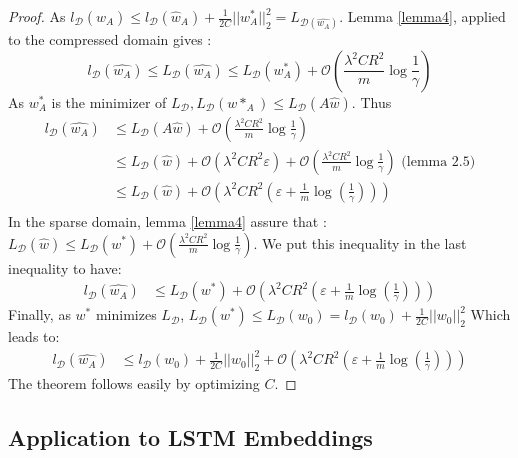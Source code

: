 \documentclass{article}
\begin{document}
\begin{proof} As 
$l_{\mathcal{D}}(\hat{w}_A) \leq l_{\mathcal{D}}(\hat{w}_A) 
+ \frac{1}{2C} ||w^*_A||_2^2 = L_{\mathcal{D}(\hat{w_A})}$.
Lemma \ref{lemma4}, applied to the compressed domain gives :
\[ l_\mathcal{D}(\hat{w_A}) \leq
    L_\mathcal{D}(\hat{w_A}) 
    \leq L_\mathcal{D}(w_A^*) 
    + \mathcal{O}\left (\frac{\lambda^2 C R^2}{m}\log \frac{1}{\gamma} \right )
\]
As $w^*_A$ is the minimizer of
 $L_{\mathcal{D}}, L_{\mathcal{D}}(w*_A) \leq L_{\mathcal{D}}(A\hat{w}) $.
Thus 
\begin{align*}
    l_\mathcal{D}(\hat{w_A}) 
    &\leq L_\mathcal{D}(A\hat{w}) 
    + \mathcal{O}\left (\frac{\lambda^2 C R^2}{m}\log \frac{1}{\gamma} \right ) \\
    &\leq L_\mathcal{D}(\hat{w}) + \mathcal{O}(\lambda^2 C R^2 \varepsilon)
    + \mathcal{O}\left (\frac{\lambda^2 C R^2}{m}\log \frac{1}{\gamma} \right ) 
    \text{    (lemma 2.5)}\\
    &\leq L_\mathcal{D}(\hat{w}) 
    + \mathcal{O}\left ( 
        \lambda^2CR^2 \left (
        \varepsilon + \frac{1}{m} \log(\frac{1}{\gamma})
        \right ) \right ) \\
\end{align*}
In the sparse domain, lemma \ref{lemma4} assure that : 
$L_{\mathcal{D}}(\hat{w}) \leq L_{\mathcal{D}}(w^*) + \mathcal{O}\left (\frac{\lambda^2 C R^2}{m}\log \frac{1}{\gamma} \right )
$.
We put this inequality in the last inequality to have:
\begin{align*}
    l_\mathcal{D}(\hat{w_A})    
    &\leq L_\mathcal{D}(w^*) 
    + \mathcal{O}\left ( 
        \lambda^2CR^2 \left (
        \varepsilon + \frac{1}{m} \log(\frac{1}{\gamma})
        \right ) \right )
\end{align*}
Finally, as $w^*$ minimizes $L_{\mathcal{D}}$, 
$L_{\mathcal{D}}(w^*) \leq L_{\mathcal{D}}(w_0) =
 l_{\mathcal{D}}(w_0) + \frac{1}{2C}||w_0||_2^2$
 Which leads to:
 \begin{align*}
    l_\mathcal{D}(\hat{w_A})    
    &\leq  l_{\mathcal{D}}(w_0) + \frac{1}{2C}||w_0||_2^2
    + \mathcal{O}\left ( 
        \lambda^2CR^2 \left (
        \varepsilon + \frac{1}{m} \log(\frac{1}{\gamma})
        \right ) \right )
 \end{align*}
 The theorem follows easily by optimizing $C$. 
\end{proof}


\subsection{Application to LSTM Embeddings}
\end{document}
